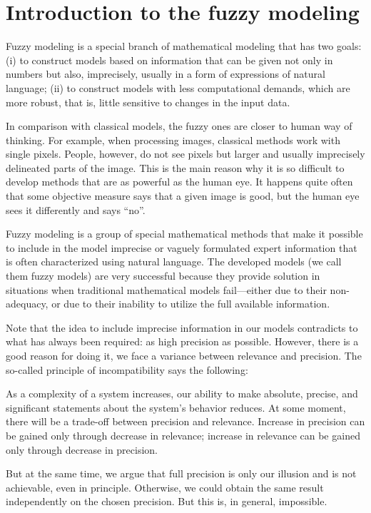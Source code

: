 \section{Introduction to the fuzzy modeling}
Fuzzy modeling is a special branch of mathematical modeling that has two goals:
(i) to construct models based on information that can be given not only in numbers
but also, imprecisely, usually in a form of expressions of natural language; (ii) to
construct models with less computational demands, which are more robust, that is,
little sensitive to changes in the input data.

In comparison with classical models, the fuzzy ones are closer to human way of
thinking. For example, when processing images, classical methods work with single
pixels. People, however, do not see pixels but larger and usually imprecisely delineated parts of the image. This is the main reason why it is so difficult to develop
methods that are as powerful as the human eye. It happens quite often that some objective measure says that a given image is good, but the human eye sees it differently and
says “no”.

Fuzzy modeling is a group of special mathematical methods that make it possible to
include in the model imprecise or vaguely formulated expert information that is often
characterized using natural language. The developed models (we call them fuzzy
models) are very successful because they provide solution in situations when traditional mathematical models fail—either due to their non-adequacy, or due to their
inability to utilize the full available information.

Note that the idea to include imprecise information in our models contradicts to what has always been required: as high precision as possible. However, there is a good reason for doing it, we face a variance between relevance and precision. The so-called principle of incompatibility \cite{zadeh} says the following:

As a complexity of a system increases, our ability to make absolute, precise, and significant statements about the system's behavior reduces. At some moment, there will be a trade-off between precision and relevance. Increase in precision can be gained only through decrease in relevance; increase in relevance can be gained only through decrease in precision.

But at the same time, we argue that full precision is only our illusion and is not achievable, even in principle. Otherwise, we could obtain the same result independently on the chosen precision. But this is, in general, impossible. 

